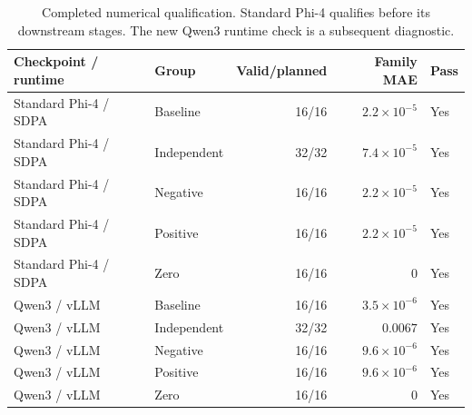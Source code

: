 \begin{table}[t]
\centering
\begin{tabular*}{\textwidth}{@{\extracolsep{\fill}}llrrl@{}}
\toprule
Checkpoint / runtime & Group & Valid/planned & Family MAE & Pass \\
\midrule
Standard Phi-4 / SDPA & Baseline & 16/16 & $2.2\times10^{-5}$ & Yes \\
Standard Phi-4 / SDPA & Independent & 32/32 & $7.4\times10^{-5}$ & Yes \\
Standard Phi-4 / SDPA & Negative & 16/16 & $2.2\times10^{-5}$ & Yes \\
Standard Phi-4 / SDPA & Positive & 16/16 & $2.2\times10^{-5}$ & Yes \\
Standard Phi-4 / SDPA & Zero & 16/16 & $0$ & Yes \\
Qwen3 / vLLM & Baseline & 16/16 & $3.5\times10^{-6}$ & Yes \\
Qwen3 / vLLM & Independent & 32/32 & $0.0067$ & Yes \\
Qwen3 / vLLM & Negative & 16/16 & $9.6\times10^{-6}$ & Yes \\
Qwen3 / vLLM & Positive & 16/16 & $9.6\times10^{-6}$ & Yes \\
Qwen3 / vLLM & Zero & 16/16 & $0$ & Yes \\
\bottomrule
\end{tabular*}
\caption{Completed numerical qualification. Standard Phi-4 qualifies before its downstream stages. The new Qwen3 runtime check is a subsequent diagnostic.}
\label{tab:review-qualification}
\end{table}
